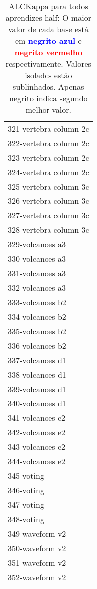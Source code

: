\begin{table}[h]
\caption{ALCKappa para todos aprendizes half: O maior valor de cada base está em \textcolor{blue}{\textbf{negrito azul}} e \textcolor{red}{\textbf{negrito vermelho}} respectivamente. Valores isolados estão sublinhados. Apenas negrito indica segundo melhor valor.}
\begin{center}\begin{tabular}{l}
 & \\ \hline 321-vertebra column 2c &  \\
322-vertebra column 2c &  \\
323-vertebra column 2c &  \\
324-vertebra column 2c &  \\
325-vertebra column 3c &  \\
326-vertebra column 3c &  \\
327-vertebra column 3c &  \\ \hline
328-vertebra column 3c &  \\
329-volcanoes a3 &  \\
330-volcanoes a3 &  \\
331-volcanoes a3 &  \\
332-volcanoes a3 &  \\
333-volcanoes b2 &  \\
334-volcanoes b2 &  \\ \hline
335-volcanoes b2 &  \\
336-volcanoes b2 &  \\
337-volcanoes d1 &  \\
338-volcanoes d1 &  \\
339-volcanoes d1 &  \\
340-volcanoes d1 &  \\
341-volcanoes e2 &  \\ \hline
342-volcanoes e2 &  \\
343-volcanoes e2 &  \\
344-volcanoes e2 &  \\
345-voting &  \\
346-voting &  \\
347-voting &  \\
348-voting &  \\ \hline
349-waveform v2 &  \\
350-waveform v2 &  \\
351-waveform v2 &  \\
352-waveform v2 &  \\\end{tabular}\label{stratsALCKappa10AllReduxallb}
\end{center}
\end{table}
